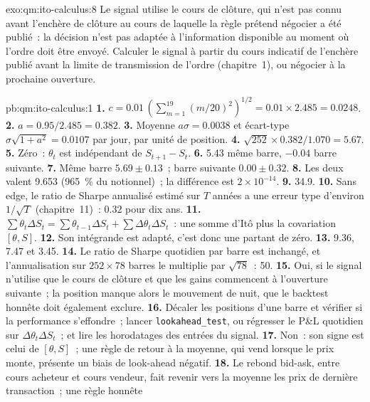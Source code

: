\begin{solution}{exo:qm:ito-calculus:8}
Le signal utilise le cours de clôture, qui n'est pas connu avant l'enchère de clôture au cours de laquelle la
règle prétend négocier a été publié~: la décision n'est pas adaptée à l'information disponible
au moment où l'ordre doit être envoyé. Calculer le signal à partir du cours indicatif de l'enchère publié
avant la limite de transmission de l'ordre (chapitre~1), ou négocier à la prochaine ouverture.
\end{solution}

\begin{solution}{pb:qm:ito-calculus:1}
\textbf{1.} $c = 0.01\,(\sum_{m=1}^{19}(m/20)^2)^{1/2} = 0.01 \times 2.485 = 0.0248$.
\textbf{2.} $a = 0.95/2.485 = 0.382$.
\textbf{3.} Moyenne $a\sigma = 0.0038$ et écart-type $\sigma\sqrt{1 + a^2} = 0.0107$ par jour, par
unité de position.
\textbf{4.} $\sqrt{252} \times 0.382/1.070 = 5.67$.
\textbf{5.} Zéro~: $\theta_{t}$ est indépendant de $S_{t+1} - S_t$.
\textbf{6.} 5.43 même barre, $-0.04$ barre suivante.
\textbf{7.} Même barre $5.69 \pm 0.13$~; barre suivante $0.00 \pm 0.32$.
\textbf{8.} Les deux valent 9.653 (965~\% du notionnel)~; la différence est $2 \times 10^{-14}$.
\textbf{9.} 34.9.
\textbf{10.} Sans edge, le ratio de Sharpe annualisé estimé sur $T$ années a une erreur type
d'environ $1/\sqrt T$ (chapitre~11)~: $0.32$ pour dix ans.
\textbf{11.} $\sum\theta_t\Delta S_t = \sum\theta_{t-1}\Delta S_t + \sum\Delta\theta_t\Delta S_t$~: une somme d'Itô plus la
covariation $[\theta, S]$.
\textbf{12.} Son intégrande est adapté, c'est donc une  partant de zéro.
\textbf{13.} 9.36, 7.47 et 3.45.
\textbf{14.} Le ratio de Sharpe quotidien par barre est inchangé, et l'annualisation sur $252 \times 78$ barres
le multiplie par $\sqrt{78}$~: 50.
\textbf{15.} Oui, si le signal n'utilise que le cours de clôture et que les gains commencent à l'ouverture suivante~; la
position manque alors le mouvement de nuit, que le backtest honnête doit également exclure.
\textbf{16.} Décaler les positions d'une barre et vérifier si la performance s'effondre~; lancer
\texttt{lookahead\_test}, ou régresser le P\&L quotidien sur $\Delta\theta_t\Delta S_t$~; et lire les
horodatages des entrées du signal.
\textbf{17.} Non~: son signe est celui de $[\theta, S]$~; une règle de retour à la moyenne, qui vend lorsque le
prix monte, présente un biais de look-ahead négatif.
\textbf{18.} Le rebond bid-ask, entre cours acheteur et cours vendeur, fait revenir vers la moyenne les prix de dernière transaction~; une règle honnête

\end{solution}
